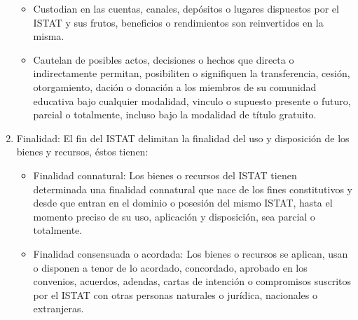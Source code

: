 \begin{enumerate}
\begin{itemize}
\item Custodian en las cuentas, canales, depósitos o lugares dispuestos por el ISTAT y sus frutos, beneficios o rendimientos son reinvertidos en la misma. 
\item Cautelan de posibles actos, decisiones o hechos que directa o indirectamente permitan, posibiliten o signifiquen la transferencia, cesión, otorgamiento, dación o donación a los miembros de su comunidad educativa bajo cualquier modalidad, vinculo o supuesto presente o futuro, parcial o totalmente, incluso bajo la modalidad de título gratuito. 
\end{itemize}
\item Finalidad: El fin del ISTAT delimitan la finalidad del uso y disposición de los bienes y recursos, éstos tienen: 
\begin{itemize}
\item Finalidad connatural: Los bienes o recursos del ISTAT tienen determinada una finalidad connatural que nace de los fines constitutivos y desde que entran en el dominio o posesión del mismo ISTAT, hasta el momento preciso de su uso, aplicación y disposición, sea parcial o totalmente. 
\item Finalidad consensuada o acordada: Los bienes o recursos se aplican, usan o disponen a tenor de lo acordado, concordado, aprobado en los convenios, acuerdos, adendas, cartas de intención o compromisos suscritos por el ISTAT con otras personas naturales o jurídica, nacionales o extranjeras. 
\end{itemize}
\end{enumerate}
